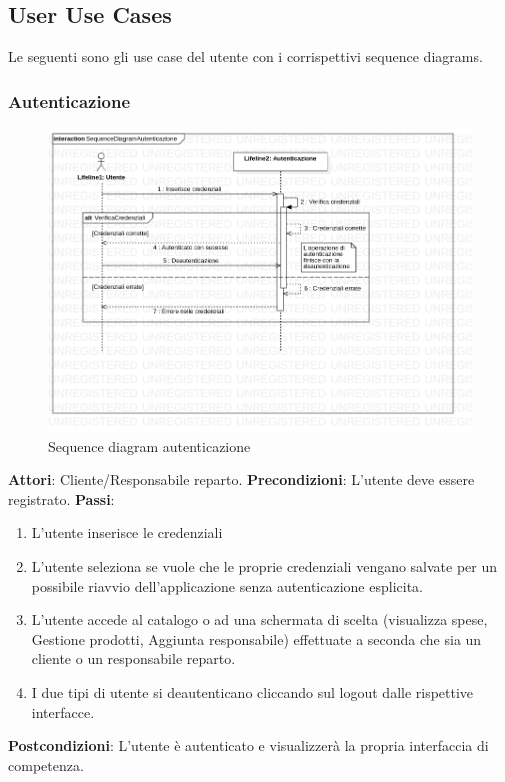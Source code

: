 \documentclass[12pt, a4paper]{report}
\begin{document}
\subsection{User Use Cases}

Le seguenti sono gli use case del utente con i corrispettivi sequence diagrams.

\subsubsection{Autenticazione}

\begin{figure}[h]
  \centering
  \includegraphics[width=\textwidth]{Use Case Model!Autenticazione!InteractionAutenticazione!SequenceDiagramAutenticazione_7.png}
  \caption{Sequence diagram autenticazione}
\end{figure}
\break
\textbf{Attori}: Cliente/Responsabile reparto.\newline
\textbf{Precondizioni}: L'utente deve essere registrato. \newline
\textbf{Passi}: 
\begin{enumerate}
\item L'utente inserisce le credenziali
\item L'utente seleziona se vuole che le proprie credenziali vengano salvate per un possibile riavvio dell'applicazione senza autenticazione esplicita.
\item L'utente accede al catalogo o ad una schermata di scelta (visualizza spese, Gestione prodotti, Aggiunta responsabile) effettuate a seconda che sia un cliente o un responsabile reparto.
\item I due tipi di utente si deautenticano cliccando sul logout dalle rispettive interfacce.
\end{enumerate}
\textbf{Postcondizioni}: L'utente è autenticato e visualizzerà la propria interfaccia di competenza.
\break
\end{document}
